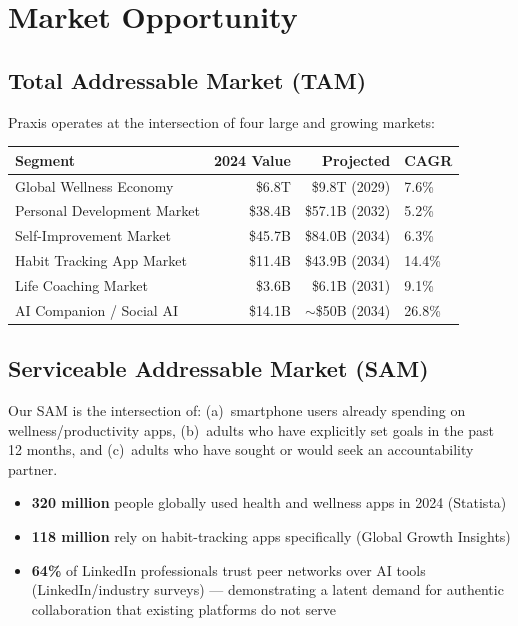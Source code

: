 \documentclass[11pt,a4paper]{article}
\begin{document}
\section{Market Opportunity}

\subsection{Total Addressable Market (TAM)}

Praxis operates at the intersection of four large and growing markets:

\begin{center}
\begin{tabular}{lrrl}
\toprule
\textbf{Segment} & \textbf{2024 Value} & \textbf{Projected} & \textbf{CAGR} \\
\midrule
Global Wellness Economy & \$6.8T & \$9.8T (2029) & 7.6\% \\
Personal Development Market & \$38.4B & \$57.1B (2032) & 5.2\% \\
Self-Improvement Market & \$45.7B & \$84.0B (2034) & 6.3\% \\
Habit Tracking App Market & \$11.4B & \$43.9B (2034) & 14.4\% \\
Life Coaching Market & \$3.6B & \$6.1B (2031) & 9.1\% \\
AI Companion / Social AI & \$14.1B & $\sim$\$50B (2034) & 26.8\% \\
\bottomrule
\end{tabular}
\end{center}

\subsection{Serviceable Addressable Market (SAM)}

Our SAM is the intersection of: (a)~smartphone users already spending on wellness/productivity apps, (b)~adults who have explicitly set goals in the past 12 months, and (c)~adults who have sought or would seek an accountability partner.

\begin{itemize}
  \item \textbf{320 million} people globally used health and wellness apps in 2024 {\small (Statista)}
  \item \textbf{118 million} rely on habit-tracking apps specifically {\small (Global Growth Insights)}
  \item \textbf{64\%} of LinkedIn professionals trust peer networks over AI tools {\small (LinkedIn/industry surveys)} — demonstrating a latent demand for authentic collaboration that existing platforms do not serve
\end{itemize}
\end{document}
